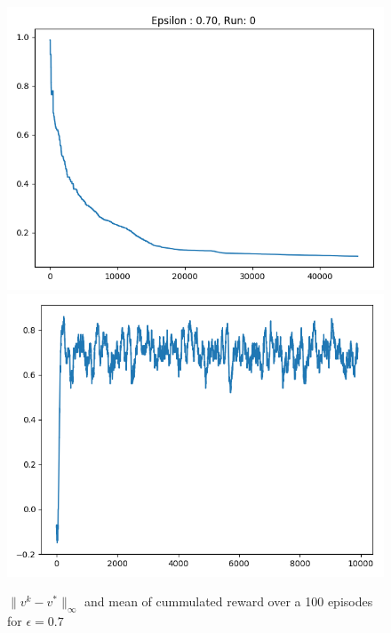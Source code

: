 \documentclass[10pt,a4paper]{article}
\begin{document}
\begin{figure}[h]
\centering
\caption{$\parallel v^k - v^* \parallel_{\infty}$ and mean of cummulated reward over a 100 episodes for $\epsilon=0.7$}
\includegraphics[scale=.35]{q5_v_7.png}
\includegraphics[scale=.35]{q5_r_7.png}
\end{figure}
\end{document}
